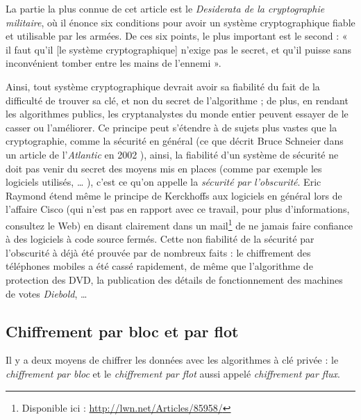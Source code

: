 La partie la plus connue de cet article est le
\emph{Desiderata de la cryptographie militaire}, où il énonce six
conditions pour avoir un système cryptographique fiable et utilisable
par les armées. De ces six points, le plus important est le second : «
il faut qu’il [le système cryptographique] n’exige pas le secret, et
qu’il puisse sans inconvénient tomber entre les mains de l’ennemi
». 

Ainsi, tout système cryptographique devrait avoir sa fiabilité du
fait de la
difficulté de trouver sa clé, et non du secret de l'algorithme ; de
plus, en rendant les algorithmes publics, les cryptanalystes du monde
entier peuvent essayer de le casser ou l'améliorer. Ce principe peut
s'étendre à de sujets plus vastes que la cryptographie, comme la
sécurité en général (ce que décrit Bruce Schneier dans un article de
l'\emph{Atlantic} en 2002 \cite{HomelandInsecurity}), ainsi, la
fiabilité d'un système de sécurité ne doit pas venir du secret des
moyens mis en places (comme par exemple les logiciels utilisés, \dots
), c'est ce qu'on appelle la \emph{sécurité par l'obscurité}. Eric
Raymond étend même le principe de Kerckhoffs aux logiciels en général
lors de l'affaire Cisco (qui n'est pas en rapport avec ce travail,
pour plus d'informations, consultez le Web) en disant clairement dans
un mail\footnote{Disponible ici :
  \url{http://lwn.net/Articles/85958/}} de ne jamais faire confiance à
des logiciels à code source fermés. Cette non fiabilité de la
sécurité par l'obscurité à déjà été prouvée par de nombreux faits : le
chiffrement des téléphones mobiles a été cassé rapidement, de même que
l'algorithme de protection des DVD, la publication des détails de
fonctionnement des machines de votes \emph{Diebold}, \dots

\subsection{Chiffrement par bloc et par flot}
Il y a deux moyens de chiffrer les données avec les algorithmes à clé
privée : le \emph{chiffrement par bloc} et le \emph{chiffrement
par flot} aussi appelé \emph{chiffrement par flux}. \\

